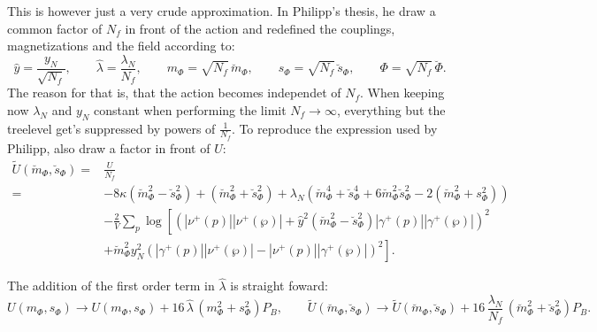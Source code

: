 This is however just a very crude approximation. In Philipp's thesis, he draw a common factor of $N_f$ in front of the action and redefined the couplings,
magnetizations and the field according to:
\begin{equation}\label{eq:def_reparametrization_couplingsAndMagnetization_Nf}
 \hat y = \frac{y_N}{\sqrt{N_f}},\qquad
 \hat \lambda = \frac{\lambda_N}{N_f},\qquad
 {m}_{\Phi} = \sqrt{N_f} \, \breve{m}_{\Phi},\qquad
 {s}_{\Phi} = \sqrt{N_f} \,\breve{s}_{\Phi},\qquad 
 \Phi=\sqrt{N_f}\,\breve{\Phi}.
\end{equation}
The reason for that is, that the action becomes independet of $N_f$. 
When keeping now $\lambda_N$ and $y_N$ constant when performing the limit $N_f \rightarrow \infty$, everything but the treelevel get's suppressed by 
powers of $\frac{1}{N_f}$.
To reproduce the expression used by Philipp, also draw a factor in front of $U$:
\begin{align}\label{eq:CEP_treelevel_reparametrized}
 \tilde U(\breve{m}_{\Phi},\breve{s}_{\Phi}) =& \frac{U}{N_f} \nonumber \\
            =& -8 \kappa \left( \breve{m}_{\Phi}^2 - \breve{s}_{\Phi}^2 \right)   +   \left( \breve{m}_{\Phi}^2 + \breve{s}_{\Phi}^2 \right)
                         + \lambda_N \left( \breve{m}_{\Phi}^4 + \breve{s}_{\Phi}^4 + 6 \breve{m}_{\Phi}^2 \breve{s}_{\Phi}^2
                         - 2 \left(\breve{m}_{\Phi}^2 + s_{\Phi}^2 \right) \right) 
                           \nonumber \\
                        & -\frac{2}{V} \sum\limits_p \log
                                    \left[ \left( |\nu^+(p)| |\nu^+(\wp)|   +
                                    \hat y ^2 \left( \breve{m}_{\Phi}^2 - \breve{s}_{\Phi}^2 \right) |\gamma^+(p)| |\gamma^+(\wp)|\right)^2 
                                    \nonumber \right. \\ 
                        & \left. +  \breve{m}_{\Phi}^2 y_N^2 \left( |\gamma^+(p)| |\nu^+(\wp)|   -   |\nu^+(p)| |\gamma^+(\wp)| \right)^2\right].
\end{align}

The addition of the first order term in $\hat \lambda$ is straight foward:
\begin{equation}\label{eq:CEP_oneLoopAddition}
 U(m_{\Phi}, s_{\Phi}) \rightarrow U(m_{\Phi}, s_{\Phi}) + 16\, \hat \lambda\, \left(m_{\Phi}^2+s_{\Phi}^2\right) P_B, \qquad 
 \tilde U(\breve{m}_{\Phi},\breve{s}_{\Phi}) \rightarrow  
       \tilde U(\breve{m}_{\Phi},\breve{s}_{\Phi}) + 16 \,\frac{\lambda_N}{N_f}\,\left( \breve{m}_{\Phi}^2 + \breve{s}_{\Phi}^2 \right) P_B.
\end{equation}






